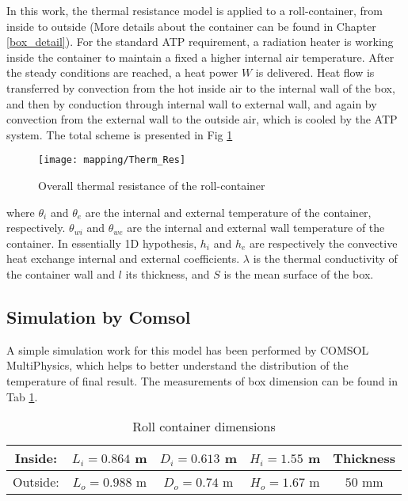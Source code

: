 In this work, the thermal resistance model is applied to a roll-container, from inside to outside (More details about the container can be found in Chapter \ref{box_detail}). For the standard ATP requirement, a radiation heater is working inside the container to maintain a fixed a higher internal air temperature. After the steady conditions are reached, a heat power $W$ is delivered. Heat flow is transferred by convection from the hot inside air to the internal wall of the box, and then by conduction through internal wall to external wall, and again by convection from the external wall to the outside air, which is cooled by the ATP system. The total scheme is presented in Fig \ref{Therm_Res}
\begin{figure}[!htpb]
	\centering
	\texttt{[image: mapping/Therm\_Res]}
	\caption{Overall thermal resistance of the roll-container}
	\label{Therm_Res}
\end{figure}

\noindent where $\theta_i$ and $\theta_e$ are the internal and external temperature of the container, respectively. $\theta_{wi}$ and $\theta_{we}$ are the internal and external wall temperature of the container. In essentially 1D hypothesis, $h_i$ and $h_e$ are respectively the convective heat exchange internal and external coefficients. $\lambda$ is the thermal conductivity of the container wall and $l$ its thickness, and $S$ is the mean surface of the box.


\subsection{Simulation by Comsol}

A simple simulation work for this model has been performed by COMSOL MultiPhysics, which helps to better understand the distribution of the temperature of final result. The measurements of box dimension can be found in Tab \ref{tab_box_dim}.

\begin{table}[h]
	\centering
	\begin{tabular}{c|c|c|c||c}
		\hline
		Inside:  & $L_i=0.864$ m  & $D_i=0.613$ m  & $H_i=1.55$ m & Thickness\\
		\hline
		Outside:  & $L_o=0.988$ m & $D_o=0.74$ m & $H_o=1.67$ m  &  $50$ mm \\
		\hline
	\end{tabular}
	\caption{Roll container dimensions}
	\label{tab_box_dim}
\end{table}

